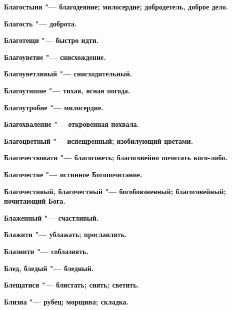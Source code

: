 \begin{multicols}{2}
\bfseries Благостыня\normalfont{} "--- благодеяние; милосердие; добродетель, доброе дело. 




\bfseries Благость\normalfont{} "--- доброта. 




\bfseries Благотещи\normalfont{} "--- быстро идти. 




\bfseries Благоуветие\normalfont{} "--- снисхождение. 




\bfseries Благоуветливый\normalfont{} "--- снисходительный. 




\bfseries Благоутишие\normalfont{} "--- тихая, ясная погода. 




\bfseries Благоутробие\normalfont{} "--- милосердие. 




\bfseries Благохваление\normalfont{} "--- откровенная похвала. 




\bfseries Благоцветный\normalfont{} "--- испещренный; изобилующий цветами. 




\bfseries Благочествовати\normalfont{} "--- благоговеть; благоговейно почитать кого-либо. 




\bfseries Благочестие\normalfont{} "--- истинное Богопочитание. 




\bfseries Благочестивый, благочестный\normalfont{} "--- богобоязненный; благоговейный; почитающий Бога. 




\bfseries Блаженный\normalfont{} "--- счастливый. 




\bfseries Блажити\normalfont{} "--- ублажать; прославлять. 




\bfseries Блазнити\normalfont{} "--- соблазнять. 




\bfseries Блед, бледый\normalfont{} "--- бледный. 




\bfseries Блещатися\normalfont{} "--- блистать; сиять; светить. 




\bfseries Близна\normalfont{} "--- рубец; морщина; складка. 





\end{multicols}
